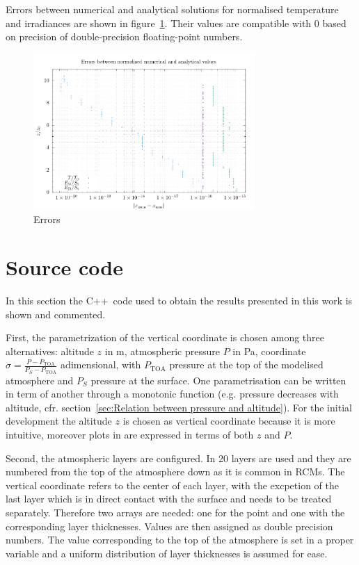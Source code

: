\documentclass[a4paper,10pt,twocolumn,\classoptions]{article}
\newcommand{\cpp}{C++}
\newcommand{\PTOA}{P_\text{TOA}}
\begin{document}
Errors between numerical and analytical solutions for normalised temperature and irradiances are shown in figure~\ref{fig:errors}. Their values are compatible with 0 based on precision of double-precision floating-point numbers.
\begin{figure}[h]
  \centering
  \includegraphics*[keepaspectratio=true,width=0.75\textwidth]{errors}
  \caption{Errors}
  \label{fig:errors}
\end{figure}



\newpage
\appendix

\onecolumn
\section{Source code}
In this section the \cpp\ code used to obtain the results presented in this work is shown and commented.

First, the parametrization of the vertical coordinate is chosen among three alternatives: altitude $z$ in \unit{\metre}, atmospheric pressure $P$ in \unit{\pascal}, coordinate $\sigma = \frac{P - \PTOA}{P_S - \PTOA}$ adimensional, with $\PTOA$ pressure at the top of the modelised atmosphere and $P_S$ pressure at the surface. One parametrisation can be written in term of another through a monotonic function (e.g. pressure decreases with altitude, cfr. section~\ref{sec:Relation between pressure and altitude}). For the initial development the altitude $z$ is chosen as vertical coordinate because it is more intuitive, moreover plots in \cite{TTAPS-I} are expressed in terms of both $z$ and $P$.

Second, the atmospheric layers are configured. In \cite{TTAPS-I} 20 layers are used and they are numbered from the top of the atmosphere down as it is common in RCMs. The vertical coordinate refers to the center of each layer, with the excpetion of the last layer which is in direct contact with the surface and needs to be treated separately. %
Therefore two arrays are needed: one for the point and one with the corresponding layer thicknesses. Values are then assigned as double precision numbers. The value corresponding to the top of the atmosphere is set in a proper variable and a uniform distribution of layer thicknesses is assumed for ease.
\end{document}
